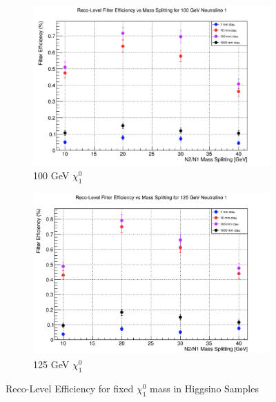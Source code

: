 \documentclass{article}
\begin{document}
\par
\begin{figure} [H]
\begin{subfigure}{.5\textwidth}
  \centering
  \includegraphics[width=.8\linewidth]{100GeVEff.png}  
  \caption{100 GeV $\chi_{1}^{0}$}
  \label{fig:sub-first19}
\end{subfigure}
\begin{subfigure}{.5\textwidth}
  \centering
  \includegraphics[width=.8\linewidth]{125GeVEff.png}  
  \caption{125 GeV $\chi_{1}^{0}$}
  \label{fig:sub-second19}
\end{subfigure}
\caption{Reco-Level Efficiency for fixed $\chi_{1}^{0}$ mass in Higgsino Samples}
\label{fig:23}
\end{figure}
\end{document}

